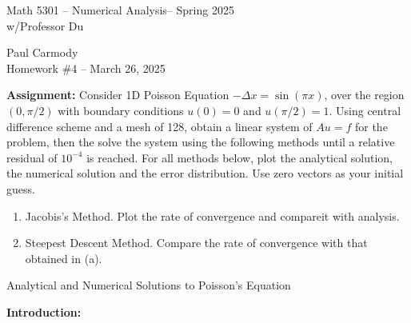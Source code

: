 \documentclass[10pt,a4paper]{report}
\newcommand{\CLASSNAME}{Math 5301 -- Numerical Analysis}
\newcommand{\STUDENTNAME}{Paul Carmody}
\newcommand{\ASSIGNMENT}{Homework \#4 }
\newcommand{\DUEDATE}{March 26, 2025}
\newcommand{\SEMESTER}{Spring 2025}
\begin{document}

\begin{center}
	\Large{\CLASSNAME -- \SEMESTER} \\
	\large{ w/Professor Du}
\end{center}
\begin{center}
	\STUDENTNAME \\
	\ASSIGNMENT -- \DUEDATE\\
\end{center} 
\HLINE

\textbf{Assignment:} Consider 1D Poisson Equation $-\Delta x = \sin (\pi x)$, over the region $(0, \pi/2)$ with boundary conditions $u(0)=0$ and $u(\pi/2)=1$.  Using central difference scheme and a mesh of 128, obtain a linear system of $Au = f$ for the problem, then the solve the system using the following methods until a relative residual of $10^{-4}$ is reached. For all methods below, plot the analytical solution, the numerical solution and the error distribution.  Use zero vectors as your initial guess.

\begin{enumerate}[label=(\alph*)]
\item Jacobis's Method.  Plot the rate of convergence and compareit with analysis.
\item Steepest Descent Method. Compare the rate of convergence with that obtained in (a).

\end{enumerate}
\HLINE
%
%
%
%
\begin{center}
	\Large{Analytical and Numerical Solutions to Poisson's Equation}
\end{center}

\noindent\textbf{Introduction:}\\
\end{document}
